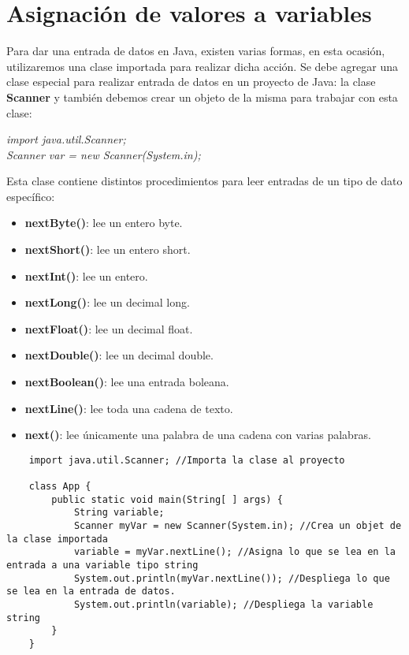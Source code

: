 \section{Asignación de valores a variables}
Para dar una entrada de datos en Java, existen varias formas, en esta ocasión, utilizaremos una clase importada para realizar dicha acción. Se debe agregar una clase especial para realizar entrada de datos en un proyecto de Java: la clase \textbf{Scanner} y también debemos crear un objeto de la misma para trabajar con esta clase:\begin{center}\textit{import java.util.Scanner;\\Scanner var = new Scanner(System.in);}\end{center}
Esta clase contiene distintos procedimientos para leer entradas de un tipo de dato específico:
\begin{itemize}
    \item \textbf{nextByte()}: lee un entero byte.
    \item \textbf{nextShort()}: lee un entero short.
    \item \textbf{nextInt()}: lee un entero.
    \item \textbf{nextLong()}: lee un decimal long.
    \item \textbf{nextFloat()}: lee un decimal float.
    \item \textbf{nextDouble()}: lee un decimal double.
    \item \textbf{nextBoolean()}: lee una entrada boleana.
    \item \textbf{nextLine()}: lee toda una cadena de texto.
    \item \textbf{next()}: lee únicamente una palabra de una cadena con varias palabras.
\end{itemize}
\begin{lstlisting}
    import java.util.Scanner; //Importa la clase al proyecto

    class App {
        public static void main(String[ ] args) {
            String variable;
            Scanner myVar = new Scanner(System.in); //Crea un objet de la clase importada
            variable = myVar.nextLine(); //Asigna lo que se lea en la entrada a una variable tipo string
            System.out.println(myVar.nextLine()); //Despliega lo que se lea en la entrada de datos.
            System.out.println(variable); //Despliega la variable string
        }
    }
\end{lstlisting}

